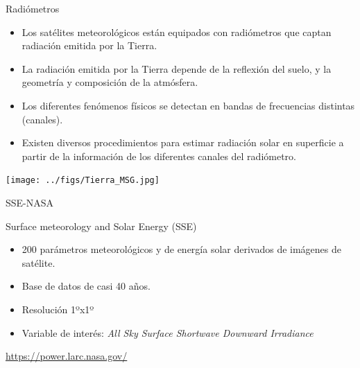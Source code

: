 \documentclass[aspectratio=169, usenames,svgnames,dvipsnames]{beamer}
\begin{document}
\begin{frame}[label={sec:org20fb641}]{Radiómetros}
\begin{itemize}
\item Los satélites meteorológicos están equipados con \alert{radiómetros}
que captan \alert{radiación emitida por la Tierra}.

\item La radiación emitida por la Tierra depende de la \alert{reflexión del
suelo}, y la \alert{geometría y composición de la atmósfera}.

\item Los diferentes fenómenos físicos se detectan en \alert{bandas de frecuencias}
distintas (canales).

\item Existen diversos procedimientos para \alert{estimar radiación solar} en
superficie a partir de la información de los diferentes canales del
radiómetro.
\end{itemize}

\begin{center}
\begin{center}
\texttt{[image: ../figs/Tierra\_MSG.jpg]}
\end{center}
\end{center}
\end{frame}
\begin{frame}[label={sec:org9de050a}]{SSE-NASA}
\begin{block}{Surface meteorology and Solar Energy (SSE)}
\begin{itemize}
\item 200 parámetros meteorológicos y de energía solar derivados de imágenes de satélite.
\item Base de datos de casi 40 años.
\item Resolución 1ºx1º
\item Variable de interés: \emph{All Sky Surface Shortwave Downward Irradiance}
\end{itemize}

\url{https://power.larc.nasa.gov/}
\end{block}
\end{frame}
\end{document}
